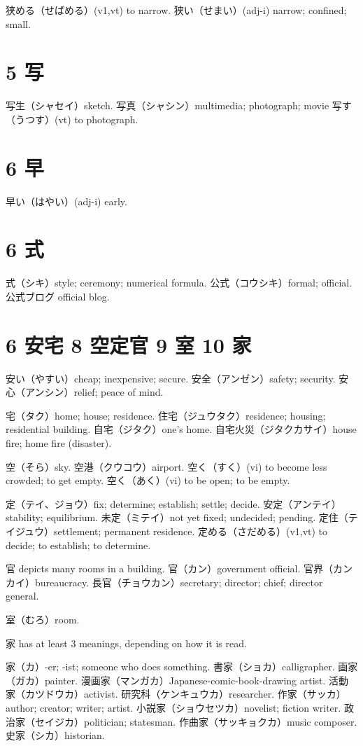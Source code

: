 狭める（せばめる）(v1,vt) to narrow.
狭い（せまい）(adj-i) narrow; confined; small.

\section{5 写}

写生（シャセイ）sketch.
写真（シャシン）multimedia; photograph; movie
写す（うつす）(vt) to photograph.

\section{6 早}

早い（はやい）(adj-i) early.

\section{6 式}

式（シキ）style; ceremony; numerical formula.
公式（コウシキ）formal; official.
公式ブログ official blog.

\section{6 安宅 8 空定官 9 室 10 家}

安い（やすい）cheap; inexpensive; secure.
安全（アンゼン）safety; security.
安心（アンシン）relief; peace of mind.

宅（タク）home; house; residence.
住宅（ジュウタク）residence; housing; residential building.
自宅（ジタク）one's home.
自宅火災（ジタクカサイ）house fire; home fire (disaster).

空（そら）sky.
空港（クウコウ）airport.
空く（すく）(vi) to become less crowded; to get empty.
空く（あく）(vi) to be open; to be empty.

定（テイ、ジョウ）fix; determine; establish; settle; decide.
安定（アンテイ）stability; equilibrium.
未定（ミテイ）not yet fixed; undecided; pending.
定住（テイジュウ）settlement; permanent residence.
定める（さだめる）(v1,vt) to decide; to establish; to determine.

官 depicts many rooms in a building.
官（カン）government official.
官界（カンカイ）bureaucracy.
長官（チョウカン）secretary; director; chief; director general.

室（むろ）room.

家 has at least 3 meanings, depending on how it is read.

家（カ）-er; -ist; someone who does something.
書家（ショカ）calligrapher.
画家（ガカ）painter.
漫画家（マンガカ）Japanese-comic-book-drawing artist.
活動家（カツドウカ）activist.
研究科（ケンキュウカ）researcher.
作家（サッカ）author; creator; writer; artist.
小説家（ショウセツカ）novelist; fiction writer.
政治家（セイジカ）politician; statesman.
作曲家（サッキョクカ）music composer.
史家（シカ）historian.

